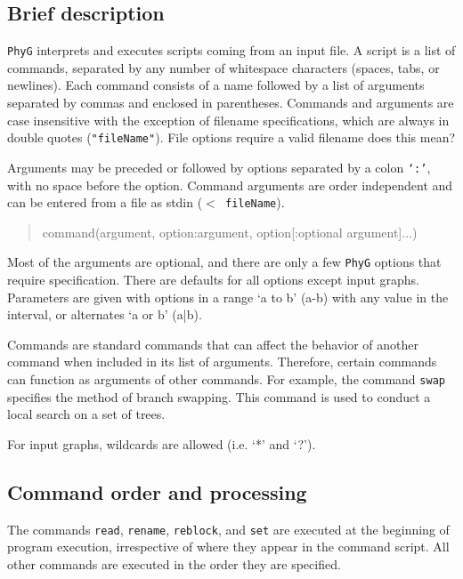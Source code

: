 \documentclass[11pt]{book}
\newcommand{\phyg}{\texttt{PhyG} }
\begin{document}
{{	\subsection{Brief description}
		\phyg interprets and executes scripts coming from an input file. A script is a list of 
		commands, separated by any number of whitespace characters (spaces, tabs, or 
		newlines). Each command consists of a name followed by a list of arguments 
		separated by commas and enclosed in parentheses. Commands and arguments 
		are case insensitive with the exception of filename specifications, which are always 
		in double quotes (\texttt{"fileName"}). File options require a valid filename %
		does this mean?} 
		Arguments may be preceded or followed by 
		options separated by a colon \texttt{`:'}, with no space before the option. Command 
		arguments are order independent and can be entered from a file as stdin 
		(\texttt{$<$ fileName}).
		
		\begin{quote}
		command(argument, option:argument, option[:optional argument]...)
		\end{quote}
	
		\noindent Most of the arguments are optional, and there are only a few \phyg options
		 that require specification. 	There are defaults for all options except input graphs. 
		 Parameters are given with options in a range `a to b' (a-b) with any value in the interval, 
		 or alternates `a or b' (a|b). 
		
		Commands are standard commands that can affect the behavior of another command 
		when included in its list of arguments. Therefore, certain commands can function as 
		arguments of other commands. For example, the command \texttt{swap} specifies 
		the method of branch swapping. This command is used to conduct a local search on 
		a set of trees. %

		For input graphs, wildcards are allowed (i.e. `*' and `?').\\
	
	
	\subsection{Command order and processing}
		The commands \texttt{read}, \texttt{rename}, \texttt{reblock}, and \texttt{set} are executed at
		the beginning of program execution, irrespective of where they appear in the command script. 
		All other commands are executed in the order they are specified.

}
\end{document}
